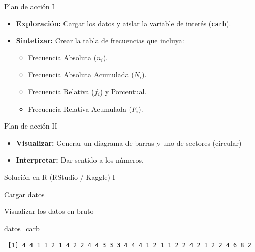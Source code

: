 \documentclass[
  ignorenonframetext,
  aspectratio=169,
  spanish,
]{beamer}
\newenvironment{Shaded}{\begin{snugshade}}{\end{snugshade}}
\newcommand{\FunctionTok}[1]{\textcolor[rgb]{0.28,0.35,0.67}{#1}}
\newcommand{\NormalTok}[1]{\textcolor[rgb]{0.00,0.23,0.31}{#1}}
\newcommand{\OtherTok}[1]{\textcolor[rgb]{0.00,0.23,0.31}{#1}}
\newcommand{\SpecialCharTok}[1]{\textcolor[rgb]{0.37,0.37,0.37}{#1}}
\providecommand{\tightlist}{%
  \setlength{\itemsep}{0pt}\setlength{\parskip}{0pt}}
\begin{document}
\begin{frame}[fragile]{Plan de acción I}
\label{plan-de-acciuxf3n-i}
\begin{itemize}
\item
  \textbf{Exploración:} Cargar los datos y aislar la variable de interés
  (\texttt{carb}).
\item
  \textbf{Sintetizar:} Crear la tabla de frecuencias que incluya:

  \begin{itemize}
  \tightlist
  \item
    Frecuencia Absoluta (\(n_i\)).
  \item
    Frecuencia Absoluta Acumulada (\(N_i\)).
  \item
    Frecuencia Relativa (\(f_i\)) y Porcentual.
  \item
    Frecuencia Relativa Acumulada (\(F_i\)).
  \end{itemize}
\end{itemize}
\end{frame}

\begin{frame}{Plan de acción II}
\label{plan-de-acciuxf3n-ii}
\begin{itemize}
\tightlist
\item
  \textbf{Visualizar:} Generar un diagrama de barras y uno de sectores
  (circular)
\item
  \textbf{Interpretar:} Dar sentido a los números.
\end{itemize}
\end{frame}

\begin{frame}[fragile]{Solución en R (RStudio / Kaggle) I}
\label{soluciuxf3n-en-r-rstudio-kaggle-i}
\begin{block}{Cargar datos}
\label{cargar-datos}
\begin{Shaded}
\end{Shaded}
\end{block}

\begin{block}{Visualizar los datos en bruto}
\label{visualizar-los-datos-en-bruto}
\begin{Shaded}
\begin{Highlighting}[]
\NormalTok{datos\_carb}
\end{Highlighting}
\end{Shaded}

\begin{verbatim}
 [1] 4 4 1 1 2 1 4 2 2 4 4 3 3 3 4 4 4 1 2 1 1 2 2 4 2 1 2 2 4 6 8 2
\end{verbatim}
\end{block}
\end{frame}
\end{document}
